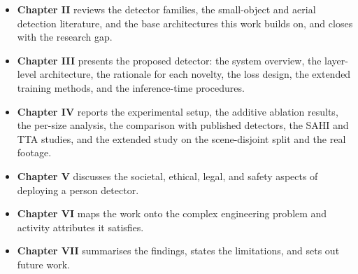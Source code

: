 \begin{itemize}
  \item \textbf{Chapter II} reviews the detector families, the small-object
        and aerial detection literature, and the base architectures this work
        builds on, and closes with the research gap.
  \item \textbf{Chapter III} presents the proposed detector: the system
        overview, the layer-level architecture, the rationale for each
        novelty, the loss design, the extended training methods, and the
        inference-time procedures.
  \item \textbf{Chapter IV} reports the experimental setup, the additive
        ablation results, the per-size analysis, the comparison with
        published detectors, the SAHI and TTA studies, and the extended
        study on the scene-disjoint split and the real footage.
  \item \textbf{Chapter V} discusses the societal, ethical, legal, and safety
        aspects of deploying a person detector.
  \item \textbf{Chapter VI} maps the work onto the complex engineering
        problem and activity attributes it satisfies.
  \item \textbf{Chapter VII} summarises the findings, states the limitations,
        and sets out future work.
\end{itemize}
